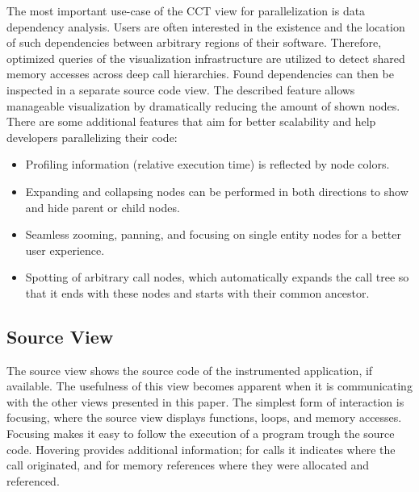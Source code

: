 The most important use-case of the CCT view for parallelization is data
dependency analysis. Users are often interested in the existence and the
location of such dependencies between arbitrary regions of their software.
Therefore, optimized queries of the visualization infrastructure are utilized
to detect shared memory accesses across deep call hierarchies. Found
dependencies can then be inspected in a separate source code view. The
described feature allows manageable visualization by dramatically reducing the
amount of shown nodes. There are some additional features that aim for better
scalability and help developers parallelizing their code:

\begin{itemize}
	\item Profiling information (relative execution time) is reflected by node
colors.
	\item Expanding and collapsing nodes can be performed in both
directions to show and hide parent or child nodes.
	\item Seamless zooming, panning, and focusing on single entity nodes for a
better user experience.
	\item Spotting of arbitrary call nodes, which automatically expands the call
tree so that it ends with these nodes and starts with their common ancestor.
\end{itemize}

\subsection{Source View}
The source view shows the source code of the instrumented application, if
available. The usefulness of this view becomes apparent when it is
communicating with the other views presented in this paper. The simplest form
of interaction is focusing, where the source view displays functions, loops,
and memory accesses. Focusing makes it easy to follow the execution of a
program trough the source code. Hovering provides additional information; for
calls it indicates where the call originated, and for memory references where
they were allocated and referenced.